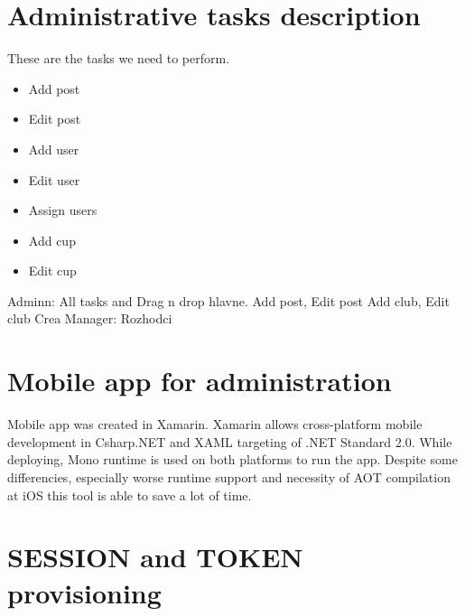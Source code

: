 \section{Administrative tasks description}
These are the tasks we need to perform.
\begin{itemize}
    \item Add post
    \item Edit post
    \item Add user
    \item Edit user
    \item Assign users
    \item Add cup
    \item Edit cup
\end{itemize}    
Adminn:
All tasks and Drag n drop hlavne.
Add post, Edit post
Add club, Edit club
Crea
Manager:
Rozhodci
\section{Mobile app for administration}
\par
Mobile app was created in Xamarin. Xamarin allows cross-platform mobile development in Csharp.NET and XAML targeting of .NET Standard 2.0. While deploying, Mono runtime is used on both platforms to run the app. Despite some differencies, especially worse runtime support and necessity of AOT compilation at iOS this tool is able to save a lot of time. 
\section{SESSION and TOKEN provisioning}